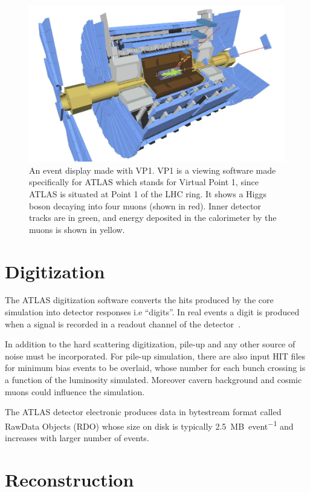 \begin{figure}[tp]
\centering
\includegraphics[width=.75\textwidth]{MCSample/simulation}
\caption{An event display made with VP1. VP1 is a viewing software made specifically for ATLAS which stands for Virtual Point 1, since ATLAS is situated at Point 1 of the LHC ring. It shows a Higgs boson decaying into four muons (shown in red). Inner detector tracks are in green, and energy deposited in the calorimeter by the muons is shown in yellow.}
\label{fig:simulation}
\end{figure}

\section{Digitization}
The ATLAS digitization software converts the hits produced by the core simulation into detector responses i.e ``digits''. In real events a digit is produced when a signal is recorded in a readout channel of the detector~\cite{simulation}.

In addition to the hard scattering digitization, pile-up and any other source of noise must be incorporated. For pile-up simulation, there are also input HIT files for minimum bias events to be overlaid, whose number for each bunch crossing is a function of the luminosity simulated. Moreover cavern background and cosmic muons could influence the simulation.

The ATLAS detector electronic produces data in bytestream format called RawData Objects (RDO) whose size on disk is typically \SI{2.5}{MB\per event} and increases with larger number of \pileup events.


\section{Reconstruction}
\label{sec:recoreal}

